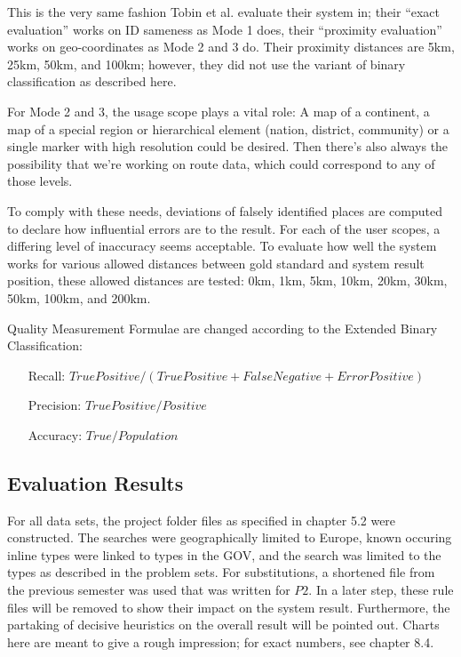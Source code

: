 \documentclass[11pt]{article}
\begin{document}
This is the very same fashion Tobin et al. evaluate their system in; their ``exact evaluation'' works on ID sameness as Mode 1 does, their ``proximity evaluation'' works on geo-coordinates as Mode 2 and 3 do. Their proximity distances are 5km, 25km, 50km, and 100km; however, they did not use the variant of binary classification as described here. \cite{tobin10}

For Mode 2 and 3, the usage scope plays a vital role: A map of a continent, a map of a special region or hierarchical element (nation, district, community) or a single marker with high resolution could be desired. Then there's also always the possibility that we're working on route data, which could correspond to any of those levels.

To comply with these needs, deviations of falsely identified places are computed to declare how influential errors are to the result. For each of the user scopes, a differing level of inaccuracy seems acceptable. To evaluate how well the system works for various allowed distances between gold standard and system result position, these allowed distances are tested: 0km, 1km, 5km, 10km, 20km, 30km, 50km, 100km, and 200km.

Quality Measurement Formulae are changed according to the Extended Binary Classification:
\begin{itemize}
\item [Recall:] $True Positive / (True Positive + False Negative + Error Positive)$
\item [Precision:] $True Positive / Positive$
\item [Accuracy:] $True / Population$
\end{itemize}

\subsection{Evaluation Results}

For all data sets, the project folder files as specified in chapter 5.2 were constructed. The searches were geographically limited to Europe, known occuring inline types were linked to types in the GOV, and the search was limited to the types as described in the problem sets. For substitutions, a shortened file from the previous semester was used that was written for $P2$. In a later step, these rule files will be removed to show their impact on the system result. Furthermore, the partaking of decisive heuristics on the overall result will be pointed out. Charts here are meant to give a rough impression; for exact numbers, see chapter 8.4.
\end{document}

